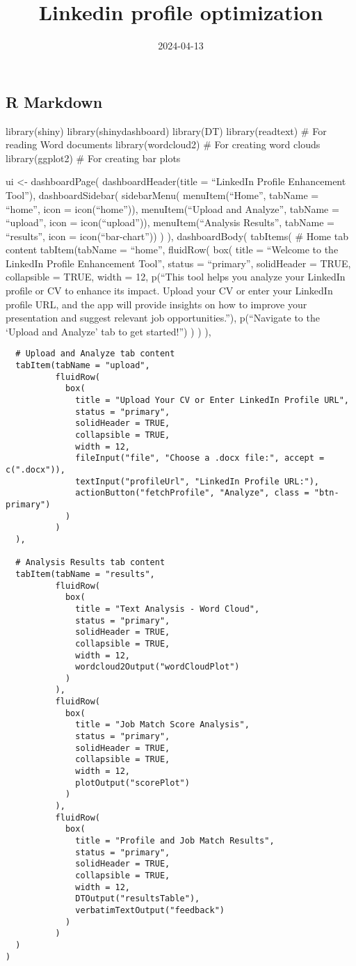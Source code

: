 \documentclass[
]{article}
\title{Linkedin profile optimization}
\author{}
\date{\vspace{-2.5em}2024-04-13}
\begin{document}
\maketitle

\hypertarget{r-markdown}{%
\subsection{R Markdown}\label{r-markdown}}

library(shiny) library(shinydashboard) library(DT) library(readtext) \#
For reading Word documents library(wordcloud2) \# For creating word
clouds library(ggplot2) \# For creating bar plots

ui \textless- dashboardPage( dashboardHeader(title = ``LinkedIn Profile
Enhancement Tool''), dashboardSidebar( sidebarMenu( menuItem(``Home'',
tabName = ``home'', icon = icon(``home'')), menuItem(``Upload and
Analyze'', tabName = ``upload'', icon = icon(``upload'')),
menuItem(``Analysis Results'', tabName = ``results'', icon =
icon(``bar-chart'')) ) ), dashboardBody( tabItems( \# Home tab content
tabItem(tabName = ``home'', fluidRow( box( title = ``Welcome to the
LinkedIn Profile Enhancement Tool'', status = ``primary'', solidHeader =
TRUE, collapsible = TRUE, width = 12, p(``This tool helps you analyze
your LinkedIn profile or CV to enhance its impact. Upload your CV or
enter your LinkedIn profile URL, and the app will provide insights on
how to improve your presentation and suggest relevant job
opportunities.''), p(``Navigate to the `Upload and Analyze' tab to get
started!'') ) ) ),

\begin{verbatim}
  # Upload and Analyze tab content
  tabItem(tabName = "upload",
          fluidRow(
            box(
              title = "Upload Your CV or Enter LinkedIn Profile URL",
              status = "primary",
              solidHeader = TRUE,
              collapsible = TRUE,
              width = 12,
              fileInput("file", "Choose a .docx file:", accept = c(".docx")),
              textInput("profileUrl", "LinkedIn Profile URL:"),
              actionButton("fetchProfile", "Analyze", class = "btn-primary")
            )
          )
  ),
  
  # Analysis Results tab content
  tabItem(tabName = "results",
          fluidRow(
            box(
              title = "Text Analysis - Word Cloud",
              status = "primary",
              solidHeader = TRUE,
              collapsible = TRUE,
              width = 12,
              wordcloud2Output("wordCloudPlot")
            )
          ),
          fluidRow(
            box(
              title = "Job Match Score Analysis",
              status = "primary",
              solidHeader = TRUE,
              collapsible = TRUE,
              width = 12,
              plotOutput("scorePlot")
            )
          ),
          fluidRow(
            box(
              title = "Profile and Job Match Results",
              status = "primary",
              solidHeader = TRUE,
              collapsible = TRUE,
              width = 12,
              DTOutput("resultsTable"),
              verbatimTextOutput("feedback")
            )
          )
  )
)
\end{verbatim}
\end{document}
